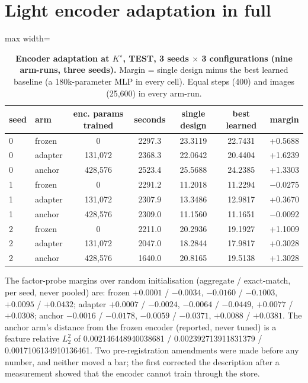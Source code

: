 \documentclass{article} %
\newcommand{\Kstar}{\ensuremath{K^{\star}}}
\begin{document}
\section{Light encoder adaptation in full}
\label{app:adapt}

\begin{table}[h]
\centering\small
\caption{\textbf{Encoder adaptation at $\Kstar$, TEST, 3 seeds $\times$ 3 configurations (nine
arm-runs, three seeds).} Margin = single design minus the best learned baseline (a 180k-parameter %
MLP in every cell). Equal steps (400) and images (25,600) in every arm-run.} %
\label{tab:adapt}
\setlength{\tabcolsep}{3pt}
\begin{adjustbox}{max width=\linewidth}\begin{tabular}{llccccc}
\toprule
seed & arm & enc. params trained & seconds & single design & best learned & margin \\
\midrule
0 & frozen & 0 & 2297.3 & 23.3119 & 22.7431 & +0.5688 \\
0 & adapter & 131,072 & 2368.3 & 22.0642 & 20.4404 & +1.6239 \\
0 & anchor & 428,576 & 2523.4 & 25.5688 & 24.2385 & +1.3303 \\
1 & frozen & 0 & 2291.2 & 11.2018 & 11.2294 & $-0.0275$ \\
1 & adapter & 131,072 & 2307.9 & 13.3486 & 12.9817 & +0.3670 \\
1 & anchor & 428,576 & 2309.0 & 11.1560 & 11.1651 & $-0.0092$ \\
2 & frozen & 0 & 2211.0 & 20.2936 & 19.1927 & +1.1009 \\
2 & adapter & 131,072 & 2047.0 & 18.2844 & 17.9817 & +0.3028 \\
2 & anchor & 428,576 & 1640.0 & 20.8165 & 19.5138 & +1.3028 \\
\bottomrule
\end{tabular}\end{adjustbox}
\end{table}

\noindent The factor-probe margins over random initialisation (aggregate / exact-match, per seed,
never pooled) are: frozen $+0.0001$ / $-0.0034$, $-0.0160$ / $-0.1003$, $+0.0095$ / $+0.0432$; adapter
$+0.0007$ / $-0.0024$, $-0.0064$ / $-0.0449$, $+0.0077$ / $+0.0308$; anchor $-0.0016$ / $-0.0178$,
$-0.0059$ / $-0.0371$, $+0.0088$ / $+0.0381$. The anchor arm's distance from the frozen encoder
(reported, never tuned) is a feature relative $L_2^2$ of 0.002146448940038681 / 0.002392713911831379 /
0.0017106134910136461. %
Two pre-registration amendments were made before any number, and neither moved a bar; the first
corrected the description after a measurement showed that the encoder cannot train through the
store. %
\end{document}
